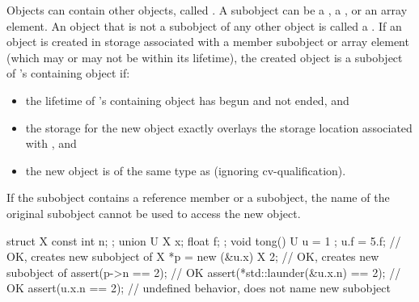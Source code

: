 \pnum
{}%
Objects can contain other objects, called .
A subobject can be
a , a ,
or an array element.
%
An object that is not a subobject of any other object is called a .
If an object is created
in storage associated with a member subobject or array element 
(which may or may not be within its lifetime),
the created object
is a subobject of 's containing object if:
\begin{itemize}
\item
the lifetime of 's containing object has begun and not ended, and
\item
the storage for the new object exactly overlays the storage location associated with , and
\item
the new object is of the same type as  (ignoring cv-qualification).
\end{itemize}
\begin{note}
If the subobject contains a reference member or a  subobject,
the name of the original subobject cannot be used to access the new object.
\end{note}
\begin{example}
\begin{codeblock}
struct X { const int n; };
union U { X x; float f; };
void tong() {
  U u = {{ 1 }};
  u.f = 5.f;                            // OK, creates new subobject of 
  X *p = new (&u.x) X {2};              // OK, creates new subobject of 
  assert(p->n == 2);                    // OK
  assert(*std::launder(&u.x.n) == 2);   // OK
  assert(u.x.n == 2);                   // undefined behavior,  does not name new subobject
}
\end{codeblock}
\end{example}

